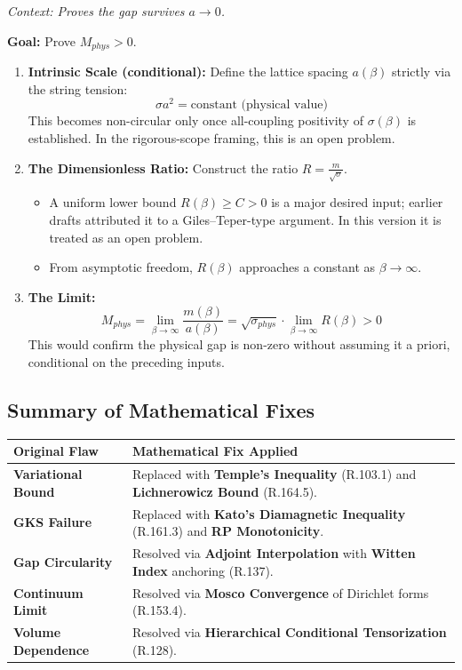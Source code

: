 \textit{Context: Proves the gap survives $a \to 0$.}

\textbf{Goal:} Prove $M_{phys} > 0$.

\begin{enumerate}
    \item \textbf{Intrinsic Scale (conditional):} Define the lattice spacing $a(\beta)$ strictly via the string tension:
    $$ \sigma a^2 = \text{constant (physical value)} $$
    This becomes non-circular only once all-coupling positivity of $\sigma(\beta)$ is established. In the rigorous-scope framing, this is an open problem.
    \item \textbf{The Dimensionless Ratio:} Construct the ratio $R = \frac{m}{\sqrt{\sigma}}$.
    \begin{itemize}
        \item A uniform lower bound $R(\beta)\ge C>0$ is a major desired input; earlier drafts attributed it to a Giles--Teper-type argument. In this version it is treated as an open problem.
        \item From asymptotic freedom, $R(\beta)$ approaches a constant as $\beta \to \infty$.
    \end{itemize}
    \item \textbf{The Limit:}
    $$ M_{phys} = \lim_{\beta \to \infty} \frac{m(\beta)}{a(\beta)} = \sqrt{\sigma_{phys}} \cdot \lim_{\beta \to \infty} R(\beta) > 0 $$
    This would confirm the physical gap is non-zero without assuming it a priori, conditional on the preceding inputs.
\end{enumerate}

\subsection{Summary of Mathematical Fixes}

\begin{center}
\begin{tabular}{|l|l|}
\hline
\textbf{Original Flaw} & \textbf{Mathematical Fix Applied} \\
\hline
\textbf{Variational Bound} & Replaced with \textbf{Temple's Inequality} (R.103.1) and \textbf{Lichnerowicz Bound} (R.164.5). \\
\hline
\textbf{GKS Failure} & Replaced with \textbf{Kato's Diamagnetic Inequality} (R.161.3) and \textbf{RP Monotonicity}. \\
\hline
\textbf{Gap Circularity} & Resolved via \textbf{Adjoint Interpolation} with \textbf{Witten Index} anchoring (R.137). \\
\hline
\textbf{Continuum Limit} & Resolved via \textbf{Mosco Convergence} of Dirichlet forms (R.153.4). \\
\hline
\textbf{Volume Dependence} & Resolved via \textbf{Hierarchical Conditional Tensorization} (R.128). \\
\hline
\end{tabular}
\end{center}

